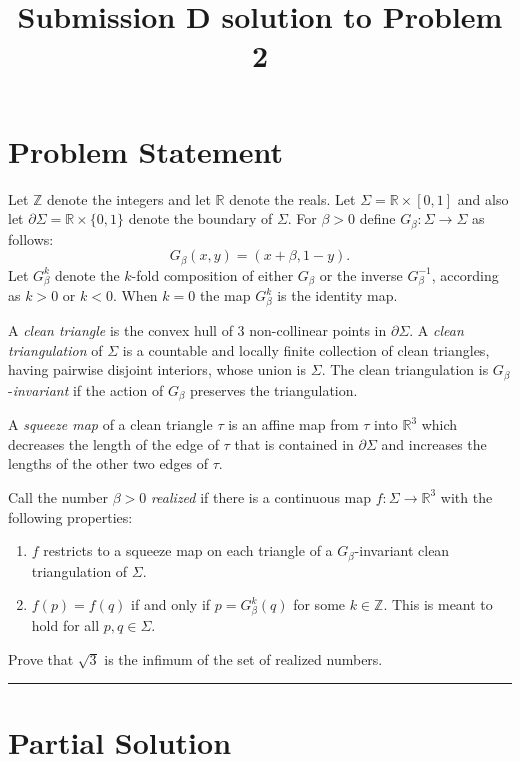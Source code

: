 \documentclass[12pt]{article}
\begin{document}
\title{Submission D solution to Problem 2}
\date{}
\maketitle

\section*{Problem Statement}

Let $\mathbb{Z}$ denote the integers and let $\mathbb{R}$ denote the reals.
Let $\Sigma= \mathbb{R} \times [0,1]$ and also let $\partial \Sigma=\mathbb{R} \times \{0,1\}$ denote the boundary of $\Sigma$. 
For $\beta>0$ define $G_{\beta}: \Sigma \to \Sigma$ as follows:
\[
G_{\beta}(x,y)=(x+\beta,1-y).
\]
Let $G_{\beta}^k$ denote the $k$-fold composition of either $G_{\beta}$ or the inverse $G_{\beta}^{-1}$, according as $k>0$ or $k<0$. When $k=0$ the map $G_{\beta}^k$ is the identity map.

A \textit{clean triangle} is the convex hull of $3$ non-collinear points in $\partial \Sigma$. 
A \textit{clean triangulation} of $\Sigma$ is a countable and locally finite collection of clean triangles, having pairwise disjoint interiors, whose union is $\Sigma$. The clean triangulation is $G_{\beta}$-\textit{invariant} if the action of $G_{\beta}$ preserves the triangulation.

A \textit{squeeze map} of a clean triangle $\tau$ is an affine map from $\tau$ into $\mathbb{R}^3$ which decreases the length of the edge of $\tau$ that is contained in $\partial \Sigma$ and increases the lengths of the other two edges of $\tau$.

Call the number $\beta>0$ \textit{realized} if there is a continuous map $f: \Sigma \to \mathbb{R}^3$ with the following properties:
\begin{enumerate}
\item $f$ restricts to a squeeze map on each triangle of a $G_{\beta}$-invariant clean triangulation of $\Sigma$.
\item $f(p)=f(q)$ if and only if $p=G_{\beta}^k(q)$ for some $k \in \mathbb{Z}$. This is meant to hold for all $p,q \in \Sigma$.
\end{enumerate}
Prove that $\sqrt 3$ is the infimum of the set of realized numbers.

\vspace{1em}
\hrule
\vspace{1em}

\section*{Partial Solution}
\end{document}
